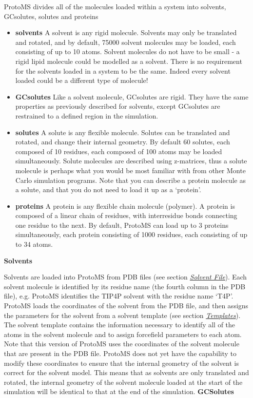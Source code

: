 \documentclass[letterpaper,10pt,english]{manual}
\begin{document}
ProtoMS divides all of the molecules loaded within a system into solvents, GCsolutes, solutes and proteins
\begin{itemize}
\item {} 
\textbf{solvents}  A solvent is any rigid molecule. Solvents may only be translated and rotated, and by default, 75000 solvent molecules may be loaded, each consisting of up to 10 atoms. Solvent molecules do not have to be small - a rigid lipid molecule could be modelled as a solvent. There is no requirement for the solvents loaded in a system to be the same. Indeed every solvent loaded could be a different type of molecule!

\item {} 
\textbf{GCsolutes} Like a solvent molecule, GCsolutes are rigid. They have the same properties as previously described for solvents, except GCsolutes are restrained to a defined region in the simulation.

\item {} 
\textbf{solutes} A solute is any flexible molecule. Solutes can be translated and rotated, and change their internal geometry. By default 60 solutes, each composed of 10 residues, each composed of 100 atoms may be loaded simultaneously. Solute molecules are described using z-matrices, thus a solute molecule is perhaps what you would be most familiar with from other Monte Carlo simulation programs. Note that you can describe a protein molecule as a solute, and that you do not need to load it up as a ‘protein’.

\item {} 
\textbf{proteins} A protein is any flexible chain molecule (polymer). A protein is composed of a linear chain of residues, with interresidue bonds connecting one residue to the next. By default, ProtoMS can load up to 3 proteins simultaneously, each protein consisting of 1000 residues, each consisting of up to 34 atoms.

\end{itemize}
\textbf{Solvents}

Solvents are loaded into ProtoMS from PDB files (see section \hyperlink{solventpdb}{\emph{Solvent File}}). Each solvent molecule is identified by its residue name (the fourth column in the PDB file), e.g. ProtoMS identifies the TIP4P solvent with the residue name ‘T4P’. ProtoMS loads the coordinates of the solvent from the PDB file, and then assigns the parameters for the solvent from a solvent template (see section \hyperlink{temref}{\emph{Templates}}). The solvent template contains the information necessary to identify all of the atoms in the solvent molecule and to assign forcefield parameters to each atom. Note that this version of ProtoMS uses the coordinates of the solvent molecule that are present in the PDB file. ProtoMS does not yet have the capability to modify these coordinates to ensure that the internal geometry of the solvent is correct for the solvent model. This means that as solvents are only translated and rotated, the internal geometry of
the solvent molecule loaded at the start of the simulation will be identical to that at the end of the simulation.
\textbf{GCSolutes}
\end{document}
